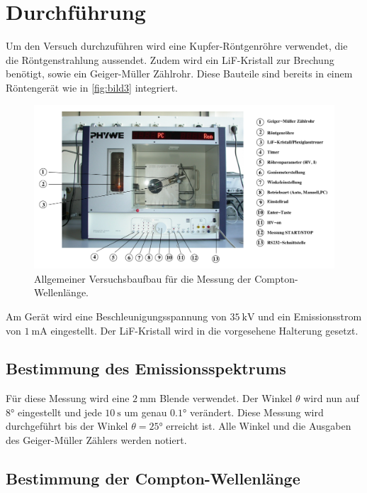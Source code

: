 \section{Durchführung}
\label{sec:durchfuehrung}

Um den Versuch durchzuführen wird eine Kupfer-Röntgenröhre verwendet, die die Röntgenstrahlung aussendet.
Zudem wird ein LiF-Kristall zur Brechung benötigt, sowie ein Geiger-Müller Zählrohr.
Diese Bauteile sind bereits in einem Röntengerät wie in \autoref{fig:bild3} integriert.

\begin{figure}
    \centering
    \includegraphics[width=\textwidth/2]{images/bild3.png}
    \caption{Allgemeiner Versuchsbaufbau für die Messung der Compton-Wellenlänge. \cite{V603}}
    \label{fig:bild3}
\end{figure}

Am Gerät wird eine Beschleunigungsspannung von $\SI{35}{\kilo\volt}$ und ein Emissionsstrom von $\SI{1}{\milli\ampere}$ eingestellt.
Der LiF-Kristall wird in die vorgesehene Halterung gesetzt.

\subsection{Bestimmung des Emissionsspektrums}
\label{ssec:a}

Für diese Messung wird eine $\SI{2}{\milli\meter}$ Blende verwendet.
Der Winkel $\theta$ wird nun auf $\ang{8}$ eingestellt und jede $\SI{10}{\second}$ um genau $\ang{0.1}$ verändert.
Diese Messung wird durchgeführt bis der Winkel $\theta = \ang{25}$ erreicht ist.
Alle Winkel und die Ausgaben des Geiger-Müller Zählers werden notiert.

\subsection{Bestimmung der Compton-Wellenlänge}
\label{ssec:b}

